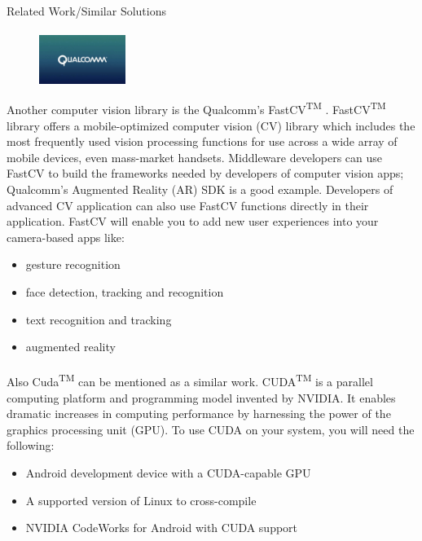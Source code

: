 \documentclass[12pt, a4paper]{article} \pagenumbering{gobble}
\begin{document}
\begin{section}{Related Work/Similar Solutions}
{  }

  \paragraph{}{
  \begin{figure}
    \centering
    \includegraphics[width=0.25\textwidth]{fastcv.jpg}
\end{figure}
Another computer vision library is the Qualcomm's FastCV\textsuperscript{TM} \cite{fastcv}. FastCV\textsuperscript{TM} library offers a
mobile-optimized computer vision (CV) library which includes the most frequently used vision processing functions
for use across a wide array of mobile devices, even mass-market handsets. Middleware developers can use FastCV to
build the frameworks needed by developers of computer vision apps; Qualcomm's Augmented Reality (AR) SDK is a good
example. Developers of advanced CV application can also use FastCV functions directly in their application. FastCV will
enable you to add new user experiences into your camera-based apps like:
\begin{itemize}
  \item gesture recognition
  \item face detection, tracking and recognition
  \item text recognition and tracking
  \item augmented reality
\end{itemize}

}

\paragraph{}{
Also Cuda\textsuperscript{TM} \cite{cuda} can be mentioned as a similar work. CUDA\textsuperscript{TM} is a parallel computing platform and programming model invented by
NVIDIA. It enables dramatic increases in computing performance by harnessing the power of the graphics processing unit
(GPU). To use CUDA on your system, you will need the following:
\begin{itemize}
  \item Android development device with a CUDA-capable GPU
  \item A supported version of Linux to cross-compile
  \item NVIDIA CodeWorks for Android with CUDA support
\end{itemize}
}

\end{section}
\end{document}
